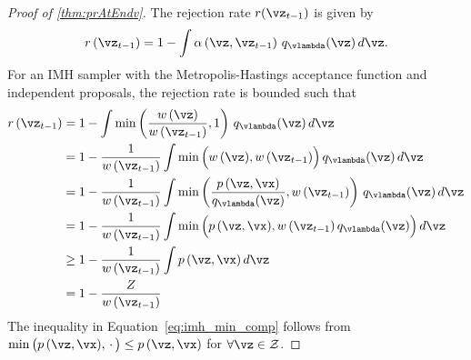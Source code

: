\label{proofsection:prAtEndv}\begin{proof}[Proof of \autoref{thm:prAtEndv}]\label{proof:prAtEndv}The rejection rate \(r(\vz _{t-1})\) is given by \begin {align} r\,(\vz _{t-1}) = 1 - \int \alpha \left (\vz , \vz _{t-1} \right ) \, q_{\vlambda }(\vz ) \, d\vz . \end {align} For an IMH sampler with the Metropolis-Hastings acceptance function and independent proposals, the rejection rate is bounded such that \begin {align} r\,(\vz _{t-1}) &= 1 - \int \min \left (\frac {w\,(\vz )}{w\,(\vz _{t-1})}, 1 \right ) \, q_{\vlambda }(\vz )\,d\vz \\ &= 1 - \frac {1}{w\,(\vz _{t-1})} \int \min \Big (w\,(\vz ), w\,(\vz _{t-1})\Big ) \, q_{\vlambda }(\vz )\,d\vz \\ &= 1 - \frac {1}{w\,(\vz _{t-1})} \int \min \left (\frac {p\,(\vz ,\vx )}{q_{\vlambda }(\vz )}, w\,(\vz _{t-1})\right ) \, q_{\vlambda }(\vz )\,d\vz \\ &= 1 - \frac {1}{w\,(\vz _{t-1})} \int \min \Big (p\,(\vz ,\vx ), w\,(\vz _{t-1})\,q_{\vlambda }(\vz )\Big ) \, d\vz \\ &\geq 1 - \frac {1}{w\,(\vz _{t-1})} \int p\,(\vz ,\vx ) \, d\vz \label {eq:imh_min_comp} \\ &= 1 - \frac {Z}{w\,(\vz _{t-1})} \end {align} The inequality in Equation~\eqref {eq:imh_min_comp} follows from \(\min \big (p\,(\vz ,\vx ), \,\cdot \, \big ) \leq p\,(\vz ,\vx ) \) for \(\forall \vz \in \mathcal {Z}\).\end{proof}
